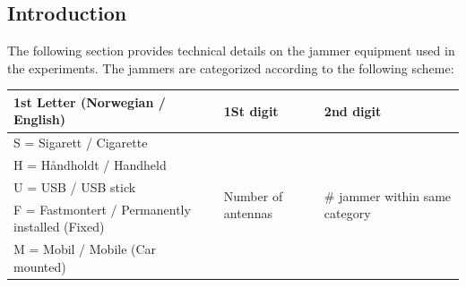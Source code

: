 
\subsection{Introduction}
The following section provides technical details on the jammer equipment used in the experiments. The jammers are categorized according to the following scheme:

\begin{table}[H]
\begin{tabular}{|l|l|l|}
\hline \rowcolor[HTML]{C0C0C0} 
\textbf{1st Letter (Norwegian / English)}    & \textbf{1St digit}                             & \textbf{2nd digit}                     \\
\hline
S = Sigarett / Cigarette            & \multirow{5}{*}{Number of antennas}   & \multirow{5}{*}{\# jammer within same category} \\
\cline{1-1}
H = Håndholdt / Handheld            &                                       &                       \\
\cline{1-1}
U = USB / USB stick                 &                                       &                       \\
\cline{1-1}
F = Fastmontert / Permanently installed (Fixed) &                           &                       \\
\cline{1-1}
M = Mobil / Mobile (Car mounted)    &                                       &                       \\
\hline              
\end{tabular}
\end{table}

